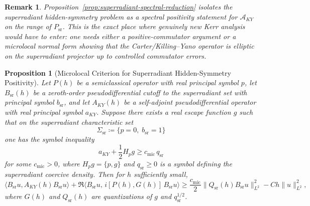 \documentclass[12pt,a4paper]{article}
\newtheorem{proposition}[theorem]{Proposition}
\newtheorem{remark}[theorem]{Remark}
\begin{document}
\begin{remark}
Proposition~\ref{prop:superradiant-spectral-reduction} isolates the superradiant hidden-symmetry problem as a spectral positivity statement for $\mathcal{A}_{KY}$ on the range of $P_{\mathrm{sr}}$. This is the exact place where genuinely new Kerr analysis would have to enter: one needs either a positive-commutator argument or a microlocal normal form showing that the Carter/Killing--Yano operator is elliptic on the superradiant projector up to controlled commutator errors.
\end{remark}

\begin{proposition}[Microlocal Criterion for Superradiant Hidden-Symmetry Positivity]\label{prop:microlocal-superradiant}
Let $P(h)$ be a semiclassical operator with real principal symbol $p$, let $B_{\mathrm{sr}}(h)$ be a zeroth-order pseudodifferential cutoff to the superradiant set with principal symbol $b_{\mathrm{sr}}$, and let $A_{KY}(h)$ be a self-adjoint pseudodifferential operator with real principal symbol $a_{KY}$. Suppose there exists a real escape function $g$ such that on the superradiant characteristic set
\begin{equation}
\Sigma_{\mathrm{sr}} \coloneqq \{p = 0,\; b_{\mathrm{sr}} = 1\}
\end{equation}
one has the symbol inequality
\begin{equation}\label{eq:microlocal-symbol-positive}
a_{KY} + \frac12 H_p g \ge c_{\mathrm{mic}}\, q_{\mathrm{sr}}
\end{equation}
for some $c_{\mathrm{mic}} > 0$, where $H_p g = \{p,g\}$ and $q_{\mathrm{sr}} \ge 0$ is a symbol defining the superradiant coercive density. Then for $h$ sufficiently small,
\begin{equation}\label{eq:microlocal-positive-commutator}
\langle B_{\mathrm{sr}}u, A_{KY}(h) B_{\mathrm{sr}}u\rangle
 + \Re \langle B_{\mathrm{sr}}u,\, i[P(h),G(h)]\,B_{\mathrm{sr}}u\rangle
\ge \frac{c_{\mathrm{mic}}}{2}\|Q_{\mathrm{sr}}(h)B_{\mathrm{sr}}u\|_{L^2}^2 - C h \|u\|_{L^2}^2,
\end{equation}
where $G(h)$ and $Q_{\mathrm{sr}}(h)$ are quantizations of $g$ and $q_{\mathrm{sr}}^{1/2}$.
\end{proposition}
\end{document}
